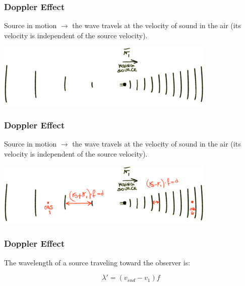 \documentclass[]{beamer}
\begin{document}
\begin{frame}
\frametitle{Doppler Effect}



Source in motion $\rightarrow$ the wave travels at the velocity of sound in the air (its velocity is independent of the source velocity).

\pause


  \begin{center}
  \includegraphics[height=1.2in]{images4/doppler3.jpg}
\end{center}


  \end{frame}



\begin{frame}
\frametitle{Doppler Effect}



Source in motion $\rightarrow$ the wave travels at the velocity of sound in the air (its velocity is independent of the source velocity).




  \begin{center}
  \includegraphics[height=1.2in]{images4/doppler4.jpg}
\end{center}


  \end{frame}




\begin{frame}
\frametitle{Doppler Effect}


The wavelength of a source traveling toward the observer is:

\begin{equation}
\lambda'=(v_{snd}-v_1)f
\end{equation}


  \end{frame}
\end{document}
